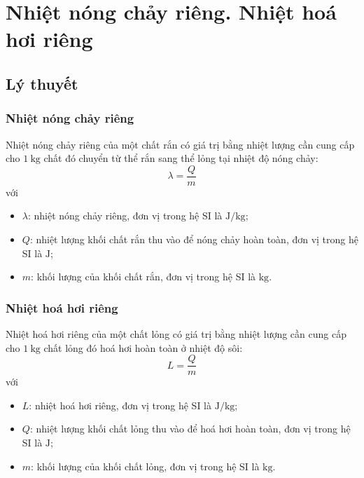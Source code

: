\let\lesson\undefined
\newcommand{\lesson}{\phantomlesson{Bài 4: Nhiệt dung riêng, nhiệt nóng chảy riêng, nhiệt hoá hơi riêng}}
\chapter[Nhiệt nóng chảy riêng. Nhiệt hoá hơi riêng]{Nhiệt nóng chảy riêng. Nhiệt hoá hơi riêng}
\section{Lý thuyết}
\subsection{Nhiệt nóng chảy riêng}
Nhiệt nóng chảy riêng của một chất rắn có giá trị bằng nhiệt lượng cần cung cấp cho $\SI{1}{\kilogram}$ chất đó chuyển từ thể rắn sang thể lỏng tại nhiệt độ nóng chảy:
\begin{equation}
	\lambda=\dfrac{Q}{m}
\end{equation}
với
\begin{itemize}
	\item $\lambda$: nhiệt nóng chảy riêng, đơn vị trong hệ SI là $\si{\joule/\kilogram}$;
	\item $Q$: nhiệt lượng khối chất rắn thu vào để nóng chảy hoàn toàn, đơn vị trong hệ SI là $\si{\joule}$;
	\item $m$: khối lượng của khối chất rắn, đơn vị trong hệ SI là $\si{\kilogram}$.
\end{itemize}
\subsection{Nhiệt hoá hơi riêng}
Nhiệt hoá hơi riêng của một chất lỏng có giá trị bằng nhiệt lượng cần cung cấp cho $\SI{1}{\kilogram}$ chất lỏng đó hoá hơi hoàn toàn ở nhiệt độ sôi:
\begin{equation}
	L=\dfrac{Q}{m}
\end{equation}
với
\begin{itemize}
	\item $L$: nhiệt hoá hơi riêng, đơn vị trong hệ SI là $\si{\joule/\kilogram}$;
	\item $Q$: nhiệt lượng khối chất lỏng thu vào để hoá hơi hoàn toàn, đơn vị trong hệ SI là $\si{\joule}$;
	\item $m$: khối lượng của khối chất lỏng, đơn vị trong hệ SI là $\si{\kilogram}$.
\end{itemize}
